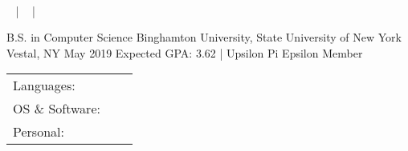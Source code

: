 \documentclass[]{awesome-cv}
\begin{document}
\begin{center}
	\ \ \  \\
	\vspace{2mm}
	{\faEnvelope\ } | {\faPhone\ } | {\faLink\ }
\end{center}

\begin{cventries}
	\cventry
	{B.S. in Computer Science}
	{Binghamton University, State University of New York}
	{Vestal, NY}
	{May 2019 Expected}
	{GPA: 3.62 | Upsilon Pi Epsilon Member}
\end{cventries}
\vspace{-2mm}

\begin{cventries}
	\cventry
	{}
	{\def\arraystretch{1.15}{\begin{tabular}{ l l }
		Languages:  & \ \ \skill{{ Python, C++, C, Java, HTML, CSS}} \\
		OS \& Software:  & \ \ \skill{{ MacOS, Linux, Windows, Git, Vim}} \\
		Personal:  & \ \ \skill{{ Communication, organization, teamwork, leadership, critical thinking}} \\
	\end{tabular}}}
	{}
	{}
	{}
\end{cventries}
\vspace{-9mm}
\end{document}
